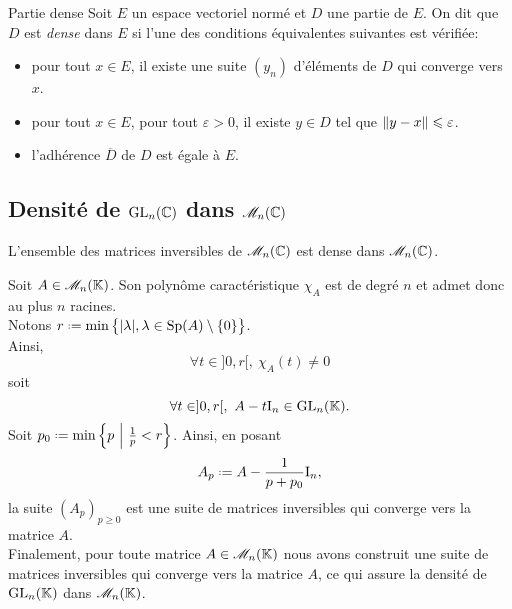 \begin{defi}{Partie dense}
    Soit $E$ un espace vectoriel normé et $D$ une partie de $E$. On dit que $D$ est \emph{dense} dans $E$ si l'une des conditions équivalentes suivantes est vérifiée:
    \begin{itemize}
        \item pour tout $x \in E$, il existe une suite $(y_n)$ d'éléments de $D$ qui converge vers $x$.
        \item pour tout $x \in E$, pour tout $\varepsilon > 0$, il existe $y \in D$ tel que $\Vert y - x \Vert \leqslant \varepsilon$.
        \item l'adhérence $\overline{D}$ de $D$ est égale à $E$.
    \end{itemize}
\end{defi}

\subsection{Densité de \texorpdfstring{$\mathrm{GL}_n(\mathbb{C})$}{GL_n(C)} dans \texorpdfstring{$\mathscr{M}_n(\mathbb{C})$}{M_n(C)}}

\begin{theo}{}
    L'ensemble des matrices inversibles de $\mathscr{M}_n(\mathbb{C})$ est dense dans $\mathscr{M}_n(\mathbb{C})$.
\end{theo}

\begin{preuve}
    Soit $A \in \mathscr{M}_n(\mathbb{K})$. Son polynôme caractéristique $\chi_A$ est de degré $n$ et admet donc au plus $n$ racines. \\
    Notons $r \defeq \min \big\{ |\lambda|, \lambda \in \Sp(A) \setminus \{0\} \big\}$. \\
    Ainsi,
    $$\forall t \in ]0,r[,\ \chi_A(t) \not= 0$$ 
    soit 
    $$\forall t \in ]0,r[,\ A - t \mathrm{I}_n\in \mathrm{GL}_n(\mathbb{K}).$$
    Soit $p_0 \defeq \min \left\{ p\ \middle|\ \frac{1}{p} < r \right\}$. Ainsi, en posant
    $$A_p \defeq A - \frac{1}{p + p_0} \I_n,$$
    la suite $(A_p)_{p \geqslant 0}$ est une suite de matrices inversibles qui converge vers la matrice $A$. \\
    Finalement, pour toute matrice $A \in \mathscr{M}_n(\mathbb{K})$ nous avons construit une suite de matrices inversibles qui converge vers la matrice $A$, ce qui assure la densité de $\mathrm{GL}_n(\mathbb{K})$ dans $\mathscr{M}_n(\mathbb{K})$.
\end{preuve}

\begin{marginfigure}[-8cm]
    \centering
    
\end{marginfigure}

